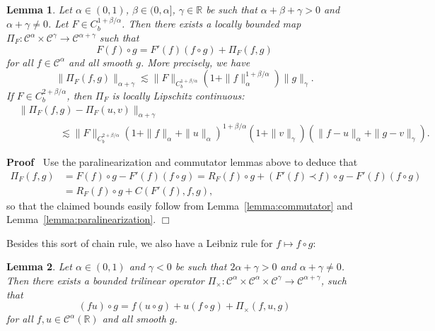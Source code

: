 \documentclass[a4paper,11pt]{article}
\newenvironment{proof}{\noindent\textbf{Proof\ }}{\hspace*{\fill}$\Box$\medskip}
\newtheorem{lemma}{Lemma}
{\theorembodyfont{\rmfamily}\newtheorem{remark}{Remark}}
\newcommand{\CC}{\mathscr{C}}
\newcommand{\lpara}{\,\mathord{\prec}\,}
\newcommand{\reso}{\,\mathord{\circ}\,}
\begin{document}
\begin{lemma}
  \label{lemma:para-taylor}Let $\alpha \in (0, 1)$, $\beta \in (0, \alpha]$,
  $\gamma \in \mathbb{R}$ be such that $\alpha + \beta + \gamma > 0$ and
  $\alpha + \gamma \neq 0$. Let $F \in C^{1 + \beta / \alpha}_b$. Then there
  exists a locally bounded map $\Pi_F : \CC^{\alpha} \times \CC^{\gamma}
  \rightarrow \CC^{\alpha + \gamma}$ such that
  \begin{equation}
    \label{eq:para-taylor} F (f) \reso g = F' (f)  (f \reso g) + \Pi_F (f, g)
  \end{equation}
  for all $f \in \CC^{\alpha}$ and all smooth $g$. More precisely, we have
  \[ \| \Pi_F (f, g)\|_{\alpha + \gamma} \lesssim \|F\|_{C^{1 + \beta /
     \alpha}_b}  (1 +\|f\|_{\alpha}^{1 + \beta / \alpha}) \|g\|_{\gamma} . \]
  If $F \in C^{2 + \beta / \alpha}_b$, then $\Pi_F$ is locally Lipschitz
  continuous:
  \begin{align*}
     &\| \Pi_F (f, g) - \Pi_F (u, v)\|_{\alpha + \gamma} \\
     &\hspace{50pt} \lesssim \|F\|_{C^{2 + \beta / \alpha}_b}  (1 +\|f\|_{\alpha} +\|u\|_{\alpha})^{1 + \beta / \alpha} (1 +\|v\|_{\gamma})  (\|f - u\|_{\alpha} +\|g - v\|_{\gamma}).
  \end{align*}
\end{lemma}

\begin{proof}
  Use the paralinearization and commutator lemmas above to deduce that
  \begin{align*}
    \Pi_F (f, g) & = F (f) \reso g - F' (f)  (f \reso g) = R_F (f) \reso g + (F'
    (f) \lpara f) \reso g - F' (f)  (f \reso g)\\
    & = R_F (f) \reso g + C (F' (f), f, g),
  \end{align*}
  so that the claimed bounds easily follow from Lemma~\ref{lemma:commutator}
  and Lemma~\ref{lemma:paralinearization}.
\end{proof}

Besides this sort of chain rule, we also have a Leibniz rule for $f \mapsto f
\reso g$:

\begin{lemma}
  \label{lem:para-taylor product}Let $\alpha \in (0, 1)$ and $\gamma < 0$ be
  such that $2 \alpha + \gamma > 0$ and $\alpha + \gamma \neq 0$. Then there
  exists a bounded trilinear operator $\Pi_{\times} : \CC^{\alpha} \times
  \CC^{\alpha} \times \CC^{\gamma} \rightarrow \CC^{\alpha + \gamma}$, such
  that
  \[ (fu) \reso g = f (u \reso g) + u (f \reso g) + \Pi_{\times} (f, u, g) \]
  for all $f, u \in \CC^{\alpha} (\mathbb{R})$ and all smooth $g$.
\end{lemma}
\end{document}
